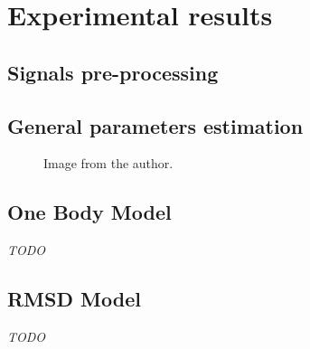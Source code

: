 \documentclass[/home/francois/latex/report/main.tex]{subfiles}
\begin{document}
\chapter{Experimental results}
\label{chapter:results}

\section{Signals pre-processing}
\label{section:results:pre-processing}


\section{General parameters estimation}
\label{section:results:general-parameters}


\begin{figure}[H]
  \centering
  \caption{ Image from the author.}
  \label{fig:results:torque_}
\end{figure}

\section{One Body Model}

\textit{TODO}

\section{RMSD Model}

\textit{TODO}
\end{document}

